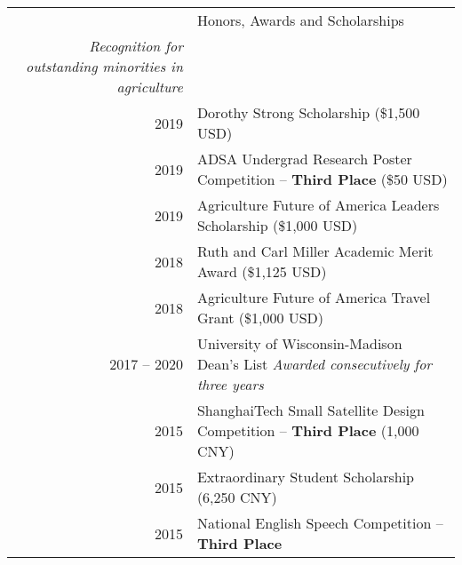 \documentclass[letterpaper, 11pt]{article}
\newcommand{\headingfont}{\Large\color{OliveGreen}}
\newenvironment{SectionTableSingleSpace}[1]{
	\renewcommand*{\arraystretch}{1.2}
	\setlength{\tabcolsep}{10pt}
	\begin{longtable}{Rp{5.2in}} & #1 \\[0.6em]}
{\end{longtable}\vspace{-.3cm}}
\begin{document}
\begin{SectionTableSingleSpace}{\headingfont Honors, Awards and Scholarships}
\textit{Recognition for outstanding minorities in agriculture} \\
2019 & 
Dorothy Strong Scholarship (\$1,500 USD) \\
2019 & 
ADSA Undergrad Research Poster Competition -- \textbf{Third Place} (\$50 USD) \\
2019 & 
Agriculture Future of America Leaders Scholarship (\$1,000 USD) \\
2018 & 
Ruth and Carl Miller Academic Merit Award (\$1,125 USD) \\
2018 & 
Agriculture Future of America Travel Grant (\$1,000 USD) \\
2017 -- 2020 & 
University of Wisconsin-Madison Dean's List \newline
\textit{Awarded consecutively for three years} \\
2015 & 
ShanghaiTech Small Satellite Design Competition -- \textbf{Third Place} (1,000 CNY) \\
2015 & 
Extraordinary Student Scholarship (6,250 CNY) \\
2015 & 
National English Speech Competition -- \textbf{Third Place}
\end{SectionTableSingleSpace}
\end{document}
